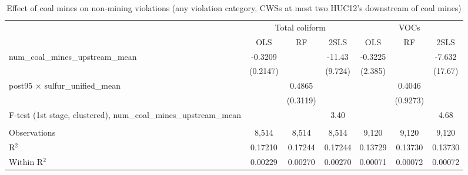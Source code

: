 
\begin{table}[htbp]
   
   \caption{\label{2sls_dwnstrm2step_nonminevio_allcat} Effect of coal mines on non-mining violations (any violation category, CWSs at most two HUC12's downstream of coal mines)}
   \bigskip
   
   \centering
   
   \begin{adjustbox}{width = \textwidth, center}
      
      
      \begin{tabular}{lcccccc}
         \toprule
         
          & \multicolumn{3}{c}{Total coliform} & \multicolumn{3}{c}{VOCs}\\
         
                                                                             & OLS           & RF            & 2SLS          & OLS           & RF            & 2SLS\\  
         
         \midrule 
         num\_coal\_mines\_upstream\_mean                                    & -0.3209       &               & -11.43        & -0.3225       &               & -7.632\\   
                                                                             & (0.2147)      &               & (9.724)       & (2.385)       &               & (17.67)\\   
         post95 $\times$ sulfur\_unified\_mean                               &               & 0.4865        &               &               & 0.4046        &   \\   
                                                                             &               & (0.3119)      &               &               & (0.9273)      &   \\   
         
         F-test (1st stage, clustered), num\_coal\_mines\_upstream\_mean     &               &               & 3.40          &               &               & 4.68\\  
         
          \\
         
         Observations                                                        & 8,514         & 8,514         & 8,514         & 9,120         & 9,120         & 9,120\\  
         R$^2$                                                               & 0.17210       & 0.17244       & 0.17244       & 0.13729       & 0.13730       & 0.13730\\  
         Within R$^2$                                                        & 0.00229       & 0.00270       & 0.00270       & 0.00071       & 0.00072       & 0.00072\\  
         

\end{tabular}
\end{adjustbox}
\end{table}
